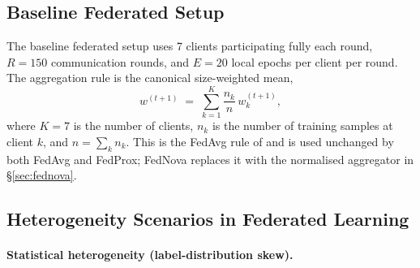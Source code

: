 \documentclass[11pt,a4paper]{report}  %
\begin{document}

\subsection{Baseline Federated Setup}
\label{sec:baseline-fl}


The baseline federated setup uses 7 clients participating fully each
round, $R = 150$ communication rounds, and $E = 20$ local epochs per
client per round. The aggregation rule is the canonical size-weighted
mean,
\begin{equation}
w^{(t+1)} \;=\; \sum_{k=1}^{K} \frac{n_k}{n}\, w_k^{(t+1)},
\label{eq:fedavg-method}
\end{equation}
where $K = 7$ is the number of clients, $n_k$ is the number of
training samples at client $k$, and $n = \sum_k n_k$. This is the
FedAvg rule of \citet{mcmahan2017fedavg} and is used unchanged by both
FedAvg and FedProx; FedNova replaces it with the normalised aggregator
in §\ref{sec:fednova}.

\subsection{Heterogeneity Scenarios in Federated Learning}
\label{sec:het-scenarios}


\paragraph{Statistical heterogeneity (label-distribution skew).}
\end{document}
